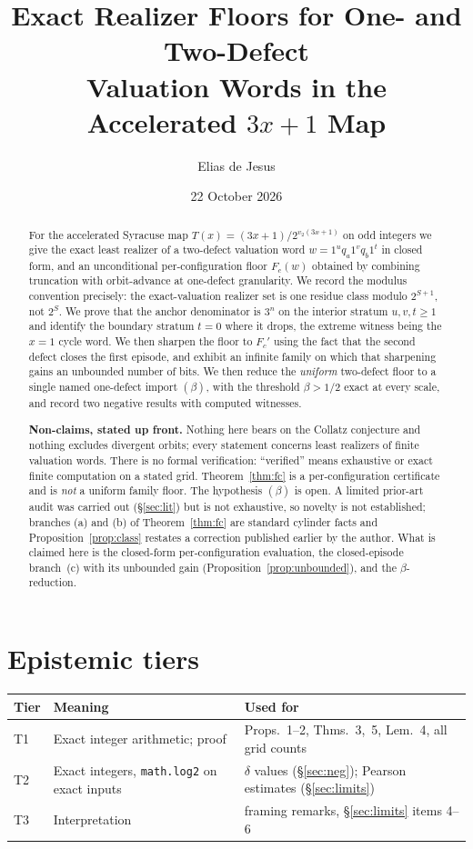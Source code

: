 \documentclass[11pt,a4paper]{article}
\title{Exact Realizer Floors for One- and Two-Defect\\
Valuation Words in the Accelerated $3x+1$ Map}
\author{Elias de Jesus}
\date{22 October 2026}
\theoremstyle{plain}
\theoremstyle{definition}
\newcommand{\Fc}{F_{c}}
\begin{document}
\maketitle

\begin{abstract}
For the accelerated Syracuse map $T(x)=(3x+1)/2^{v_2(3x+1)}$ on odd integers we
give the exact least realizer of a two-defect valuation word
$w=1^{u}q_a1^{v}q_b1^{t}$ in closed form, and an unconditional
per-configuration floor $\Fc(w)$ obtained by combining truncation with
orbit-advance at one-defect granularity. We record the modulus convention
precisely: the exact-valuation realizer set is one residue class modulo
$2^{S+1}$, not $2^{S}$. We prove that the anchor denominator is $3^{n}$ on the
interior stratum $u,v,t\ge 1$ and identify the boundary stratum $t=0$ where it
drops, the extreme witness being the $x=1$ cycle word. We then sharpen the floor to $\Fc'$ using the fact that the second defect closes the
first episode, and exhibit an infinite family on which that sharpening gains an
unbounded number of bits. We then reduce the \emph{uniform} two-defect floor to
a single named one-defect import $(\beta)$, with the threshold $\beta>1/2$
exact at every scale, and record two negative results with computed witnesses.

\medskip\noindent\textbf{Non-claims, stated up front.}
Nothing here bears on the Collatz conjecture and nothing excludes divergent
orbits; every statement concerns least realizers of finite valuation words.
There is no formal verification: ``verified'' means exhaustive or exact finite
computation on a stated grid. Theorem~\ref{thm:fc} is a per-configuration
certificate and is \emph{not} a uniform family floor. The hypothesis $(\beta)$
is open. A limited prior-art audit was carried out (\S\ref{sec:lit}) but is not
exhaustive, so novelty is not established; branches (a) and (b) of
Theorem~\ref{thm:fc} are standard cylinder facts and
Proposition~\ref{prop:class} restates a correction published earlier by the
author. What is claimed here is the closed-form per-configuration evaluation,
the closed-episode branch~(c) with its unbounded gain
(Proposition~\ref{prop:unbounded}), and the $\beta$-reduction.
\end{abstract}

\section{Epistemic tiers}

\begin{center}
\begin{tabular}{@{}llp{6.1cm}@{}}
\toprule
Tier & Meaning & Used for \\
\midrule
T1 & Exact integer arithmetic; proof & Props.~1--2, Thms.~3,~5,
Lem.~4, all grid counts \\
T2 & Exact integers, \texttt{math.log2} on exact inputs & $\delta$ values
(\S\ref{sec:neg}); Pearson estimates (\S\ref{sec:limits}) \\
T3 & Interpretation & framing remarks, \S\ref{sec:limits} items 4--6 \\
\bottomrule
\end{tabular}
\end{center}
\end{document}

